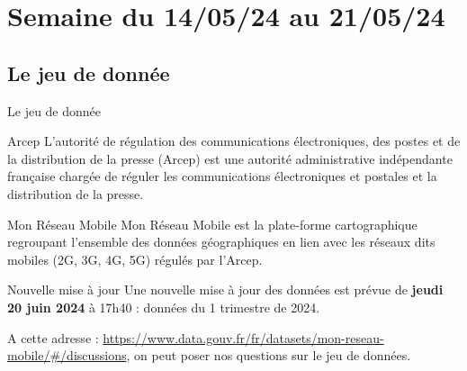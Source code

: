 \smallframetitle

\section{Semaine du 14/05/24 au 21/05/24}
\insertsectionframe
\subsection{Le jeu de donnée}
\insertsubsectionframe

\begin{frame}{Le jeu de donnée}
    \begin{block}{Arcep}
        L'autorité de régulation des communications électroniques, des postes et de la distribution de la presse (Arcep) est une autorité administrative indépendante française chargée de réguler les communications électroniques et postales et la distribution de la presse.
    \end{block}

    \begin{block}{Mon Réseau Mobile}
        Mon Réseau Mobile est la plate-forme cartographique regroupant l’ensemble des données géographiques en lien avec les réseaux dits \og mobiles \fg{} (2G, 3G, 4G, 5G) régulés par l’Arcep.
    \end{block}

    \begin{alertblock}{Nouvelle mise à jour}
        Une nouvelle mise à jour des données est prévue de \textbf{jeudi 20 juin 2024} à 17h40 : données du 1\ier{} trimestre de 2024.
    \end{alertblock}

    A cette adresse : \url{https://www.data.gouv.fr/fr/datasets/mon-reseau-mobile/\#/discussions}, on peut poser nos questions sur le jeu de données.
\end{frame}


